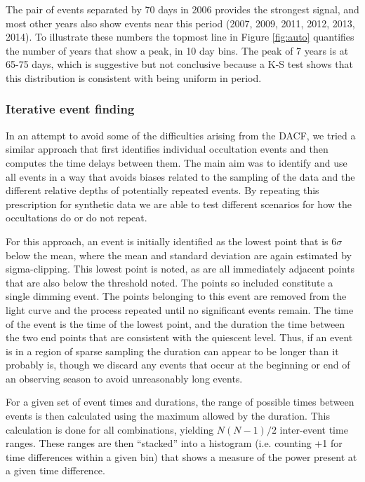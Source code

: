 \documentclass[useAMS,usenatbib,usegraphicx]{mn2e}
\begin{document}
The pair of events separated by 70 days in 2006 provides the strongest signal, and most
other years also show events near this period (2007, 2009, 2011, 2012, 2013, 2014). To
illustrate these numbers the topmost line in Figure \ref{fig:auto} quantifies the number
of years that show a peak, in 10 day bins. The peak of 7 years is at 65-75 days, which is
suggestive but not conclusive because a K-S test shows that this distribution is
consistent with being uniform in period.

\subsubsection{Iterative event finding}\label{sss:iter}

In an attempt to avoid some of the difficulties arising from the DACF, we tried a similar
approach that first identifies individual occultation events and then computes the time
delays between them. The main aim was to identify and use all events in a way that avoids
biases related to the sampling of the data and the different relative depths of
potentially repeated events. By repeating this prescription for synthetic data we are
able to test different scenarios for how the occultations do or do not repeat.

For this approach, an event is initially identified as the lowest point that is 6$\sigma$
below the mean, where the mean and standard deviation are again estimated by
sigma-clipping. This lowest point is noted, as are all immediately adjacent points that
are also below the threshold noted. The points so included constitute a single dimming
event. The points belonging to this event are removed from the light curve and the
process repeated until no significant events remain. The time of the event is the time of
the lowest point, and the duration the time between the two end points that are
consistent with the quiescent level. Thus, if an event is in a region of sparse sampling
the duration can appear to be longer than it probably is, though we discard any events
that occur at the beginning or end of an observing season to avoid unreasonably long
events.

For a given set of event times and durations, the range of possible times between events
is then calculated using the maximum allowed by the duration. This calculation is done
for all combinations, yielding $N(N-1)/2$ inter-event time ranges. These ranges are then
``stacked'' into a histogram (i.e. counting +1 for time differences within a given bin)
that shows a measure of the power present at a given time difference.
\end{document}

